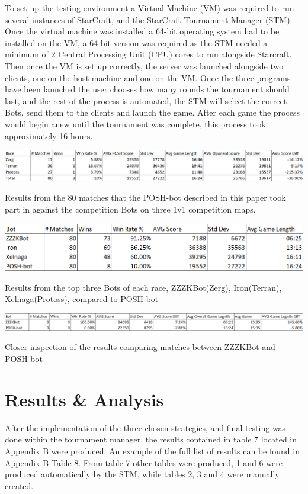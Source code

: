 \documentclass[journal]{IEEEtran}
\begin{document}
	To set up the testing environment a Virtual Machine (VM) was required to run several instances of StarCraft, and the StarCraft Tournament Manager (STM). Once the virtual machine was installed a 64-bit operating system had to be installed on the VM, a 64-bit version was required as the STM needed a minimum of 2 Central Processing Unit (CPU) cores to run alongside Starcraft. Then once the VM is set up correctly, the server was launched alongside two clients, one on the host machine and one on the VM. Once the three programs have been launched the user chooses how many rounds the tournament should last, and the rest of the process is automated, the STM will select the correct Bots, send them to the clients and launch the game. After each game the process would begin anew until the tournament was complete, this process took approximately 16 hours. 
	\begin{table}[]
		\centering
		\includegraphics[width=\textwidth]{POSH-botWin}
		\caption{Results from the 80 matches that the POSH-bot described in this paper took part in against the competition Bots on three 1v1 competition maps.}
		\label{Table3}
		\centering
		\includegraphics[width=\textwidth]{TopThreeWin}
		\caption{Results from the top three Bots of each race, ZZZKBot(Zerg), Iron(Terran), Xelnaga(Protoss), compared to POSH-bot}
		\label{Table4}
		\centering
		\includegraphics[width=\textwidth]{PvsZ}
		\caption{Closer inspection of the results comparing matches between ZZZKBot and POSH-bot}
		\label{Table5}
	\end{table}
	
	\section{Results \& Analysis}
	After the implementation of the three chosen strategies, and final testing was done within the tournament manager, the results contained in table 7 located in Appendix B were produced. An example of the full list of results can be found in Appendix B Table 8. From table 7 other tables were produced, 1 and 6 were produced automatically by the STM, while tables 2, 3 and 4 were manually created. 
		
\end{document}
